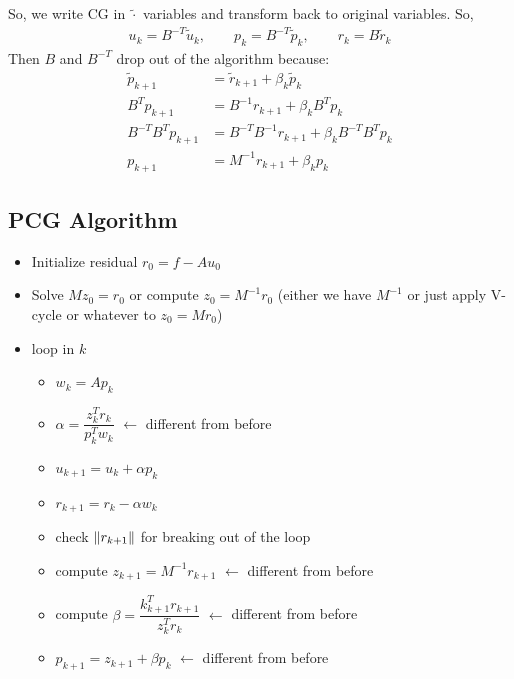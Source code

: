 \documentclass{article}
\begin{document}
        So, we write CG in $\tilde{\cdot}$ variables and transform back to original variables.  So,
        \begin{align}
            u_k = B^{-T}\tilde{u}_k, \qquad p_k = B^{-T}\tilde{p}_k, \qquad r_k = B\tilde{r}_k
        \end{align}
        Then $B$ and $B^{-T}$ drop out of the algorithm because:
        \begin{align}
            \tilde{p}_{k+1} &= \tilde{r}_{k+1} + \beta_k\tilde{p}_k \\
            B^Tp_{k+1} &= B^{-1}r_{k+1} + \beta_kB^Tp_k \\
            B^{-T}B^Tp_{k+1} &= B^{-T}B^{-1}r_{k+1} + \beta_kB^{-T}B^Tp_k \\
            p_{k+1} &= M^{-1}r_{k+1} + \beta_k p_k
        \end{align}

        \subsection{PCG Algorithm}
            \begin{itemize}
                \item Initialize residual $r_0 = f - Au_0$
                \item Solve $Mz_0 = r_0$ or compute $z_0 = M^{-1}r_0$ (either we have $M^{-1}$ or just apply V-cycle or whatever to $z_0 = Mr_0$)
                \item loop in $k$
                \begin{itemize}
                    \item $w_k = Ap_k$
                    \item $\alpha = \dfrac{z_k^Tr_k}{p_k^Tw_k}$ $\leftarrow$ different from before
                    \item $u_{k+1} = u_k + \alpha p_k$
                    \item $r_{k+1} = r_k - \alpha w_k$
                    \item check $\norm{r_{k+1}}$ for breaking out of the loop
                    \item compute $z_{k+1} = M^{-1}r_{k+1}$ $\leftarrow$ different from before
                    \item compute $\beta = \dfrac{k_{k+1}^Tr_{k+1}}{z_k^Tr_k}$ $\leftarrow$ different from before
                    \item $p_{k+1} = z_{k+1} + \beta p_k$ $\leftarrow$ different from before
                \end{itemize}
            \end{itemize}
\end{document}
